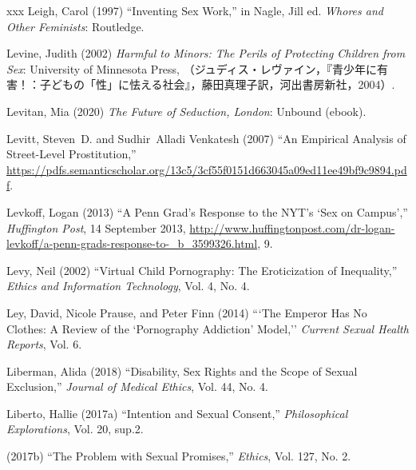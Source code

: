 \documentclass[]{jlreq} \usepackage{mystyle}
\begin{document}
\begin{thebibliography}{xxx}
Leigh, Carol (1997) ``Inventing Sex Work,'' in Nagle, Jill ed.   \textit{
  Whores and Other Feminists}: Routledge.

Levine, Judith (2002)  \textit{ Harmful to Minors: The Perils of Protecting
  Children from Sex}: University of Minnesota Press,
  （ジュディス・レヴァイン，『青少年に有害！：子どもの「性」に怯える社会』，藤田真理子訳，河出書房新社，2004）.

Levitan, Mia (2020)  \textit{ The Future of Seduction, London}: Unbound
  (ebook).

Levitt, Steven~D. and Sudhir~Alladi Venkatesh (2007) ``An Empirical Analysis of
  Street-Level Prostitution,''
  \url{https://pdfs.semanticscholar.org/13c5/3cf55f0151d663045a09ed11ee49bf9c9894.pdf}.

Levkoff, Logan (2013) ``A Penn Grad's Response to the NYT's `Sex on Campus',''
  \emph{Huffington Post}, 14 September 2013,
  \url{http://www.huffingtonpost.com/dr-logan-levkoff/a-penn-grads-response-to-_b_3599326.html},
  9.

Levy, Neil (2002) ``Virtual Child Pornography: The Eroticization of
  Inequality,'' \textit{ Ethics and Information Technology}, Vol. 4, No. 4.

Ley, David, Nicole Prause, and Peter Finn (2014) ```The Emperor Has No Clothes:
  A Review of the `Pornography Addiction' Model,'' \textit{ Current Sexual
  Health Reports}, Vol. 6.

Liberman, Alida (2018) ``Disability, Sex Rights and the Scope of Sexual
  Exclusion,'' \textit{ Journal of Medical Ethics}, Vol. 44, No. 4.

Liberto, Hallie (2017a) ``Intention and Sexual Consent,'' \textit{
  Philosophical Explorations}, Vol. 20, sup.2.

 \bysame{}  (2017b) ``The Problem with Sexual Promises,'' \textit{ Ethics},
  Vol. 127, No. 2.


\end{thebibliography}
\end{document}
